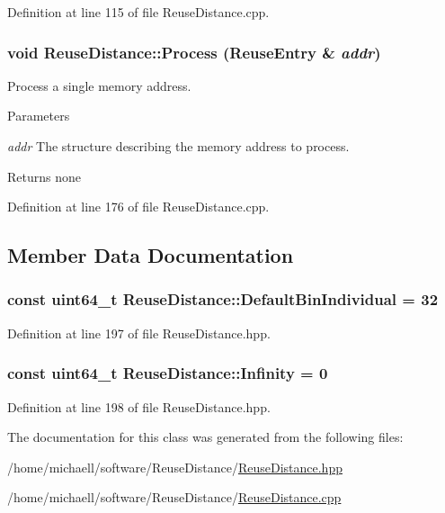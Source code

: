 Definition at line 115 of file ReuseDistance.cpp.\hypertarget{class_reuse_distance_a4ff6b77022ce62e0fdefa5cc297b932a}{
\subsubsection[{Process}]{\setlength{\rightskip}{0pt plus 5cm}void ReuseDistance::Process ({\bf ReuseEntry} \& {\em addr})}}
\label{class_reuse_distance_a4ff6b77022ce62e0fdefa5cc297b932a}
Process a single memory address.


\begin{DoxyParams}{Parameters}
\item[{\em addr}]The structure describing the memory address to process.\end{DoxyParams}
\begin{DoxyReturn}{Returns}
none 
\end{DoxyReturn}


Definition at line 176 of file ReuseDistance.cpp.

\subsection{Member Data Documentation}
\hypertarget{class_reuse_distance_af0d9cba7105109e89ae6b7177f54c976}{
\subsubsection[{DefaultBinIndividual}]{\setlength{\rightskip}{0pt plus 5cm}const uint64\_\-t {\bf ReuseDistance::DefaultBinIndividual} = 32}}
\label{class_reuse_distance_af0d9cba7105109e89ae6b7177f54c976}


Definition at line 197 of file ReuseDistance.hpp.\hypertarget{class_reuse_distance_a59f7f0ac6ad014472537619394ac7375}{
\subsubsection[{Infinity}]{\setlength{\rightskip}{0pt plus 5cm}const uint64\_\-t {\bf ReuseDistance::Infinity} = 0}}
\label{class_reuse_distance_a59f7f0ac6ad014472537619394ac7375}


Definition at line 198 of file ReuseDistance.hpp.

The documentation for this class was generated from the following files:\begin{DoxyCompactItemize}
\item 
/home/michaell/software/ReuseDistance/\hyperlink{_reuse_distance_8hpp}{ReuseDistance.hpp}\item 
/home/michaell/software/ReuseDistance/\hyperlink{_reuse_distance_8cpp}{ReuseDistance.cpp}\end{DoxyCompactItemize}
